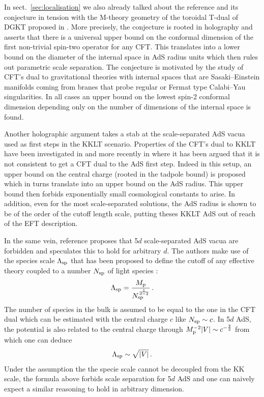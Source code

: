 \documentclass[11pt, a4paper]{article}
\newcommand{\Mp}{M_{\rm p}}
\begin{document}
In sect.~\ref{sec:localisation} we also already talked about the reference \cite{Collins:2022nux} and its conjecture in tension with the M-theory geometry of the toroidal T-dual of DGKT proposed in \cite{Cribiori:2021djm}. More precisely, the conjecture is rooted in holography and asserts that there is a universal upper bound on the conformal dimension of the first non-trivial spin-two operator for any CFT. This translates into a lower bound on the diameter of the internal space in AdS radius units which then rules out parametric scale separation. The conjecture is motivated by the study of CFT's dual to gravitational theories with internal spaces that are Sasaki--Einstein manifolds coming from branes that probe regular or Fermat type Calabi--Yau singularities. In all cases an upper bound on the lowest spin-2 conformal dimension depending only on the number of dimensions of the internal space is found.

Another holographic argument takes a stab at the scale-separated AdS vacua used as first steps in the KKLT \cite{Kachru:2003aw} scenario. Properties of the CFT's dual to KKLT have been investigated in \cite{deAlwis:2014wia} and more recently in \cite{Lust:2022lfc} where it has been argued that it is not consistent to get a CFT dual to the AdS first step. Indeed in this setup, an upper bound on the central charge (rooted in the tadpole bound) is proposed which in turns translate into an upper bound on the AdS radius. This upper bound then forbids exponentially small cosmological constants to arise. In addition, even for the most scale-separated solutions, the AdS radius is shown to be of the order of the cutoff length scale, putting theses KKLT AdS out of reach of the EFT description.

In the same vein, reference \cite{Cribiori:2023ihv} proposes that 5$d$ scale-separated AdS vacua are forbidden and speculates this to hold for arbitrary $d$. The authors make use of the species scale $\Lambda_{\rm sp}$ that has been proposed to define the cutoff of any effective theory coupled to a number $N_{\rm sp}$ of light species \cite{Arkani-Hamed:2005zuc,Distler:2005hi,Dimopoulos:2005ac,Dvali:2007hz,Dvali:2007wp,Dvali:2010vm}:
\begin{equation}
\Lambda_{\rm sp}=\frac{\Mp}{N_{\rm sp}^{\frac{1}{d-2}}}\, .
\end{equation}
%
The number of species in the bulk is assumed to be equal to the one in the CFT dual which can be estimated with the central charge $c$ like $N_{\rm sp}\sim c$. In 5$d$ AdS, the potential is also related to the central charge through $\Mp^{-2}|V|\sim c^{-\frac{2}{3}}$ from which one can deduce
\begin{equation}
\Lambda_{\rm sp}\sim \sqrt{|V|}\, .
\end{equation}
%
Under the assumption the the specie scale cannot be decoupled from the KK scale, the formula above forbids scale separation for 5$d$ AdS and one can naively expect a similar reasoning to hold in arbitrary dimension.
\end{document}
